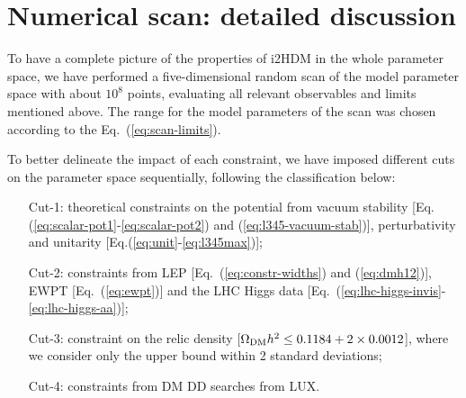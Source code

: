 \documentclass[12pt,a4paper]{article}
\begin{document}
\appendix

\section{Numerical scan: detailed discussion} \label{app:numerical}

To have a complete picture of the properties of i2HDM in the whole parameter space, we have performed a
five-dimensional random scan of the model parameter space with about $10^8$ points, evaluating all relevant
observables and limits mentioned above. The range for 
the model parameters of the scan was chosen according to the Eq.~(\ref{eq:scan-limits}).



To better delineate the impact of each constraint, we have imposed different cuts on the parameter space sequentially, 
following the classification below:
\begin{itemize}
\item[Cut-1:] theoretical constraints on the potential from vacuum stability 
[Eq.(\ref{eq:scalar-pot1}-\ref{eq:scalar-pot2}) and (\ref{eq:l345-vacuum-stab})], perturbativity  and
unitarity [Eq.(\ref{eq:unit}-\ref{eq:l345max})];
\item[Cut-2:] constraints from LEP [Eq.~(\ref{eq:constr-widths}) and (\ref{eq:dmh12})], EWPT
[Eq.~(\ref{eq:ewpt})] and the LHC Higgs data
[Eq.~(\ref{eq:lhc-higgs-invis}-\ref{eq:lhc-higgs-aa})];
\item[Cut-3:] constraint on the relic
density  [$\Omega_{\rm DM} h^2 \le 0.1184+2\times 0.0012$], where we consider only the upper bound within 2 standard deviations;
\item[Cut-4:] constraints from DM DD searches from LUX.
\end{itemize}
\end{document}
